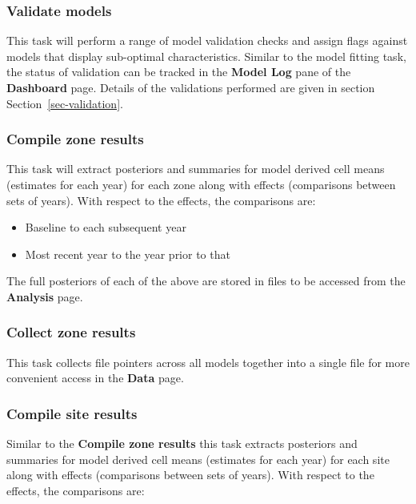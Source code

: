 \documentclass[
  8pt,
  a4paper]{article}
\providecommand{\tightlist}{%
  \setlength{\itemsep}{0pt}\setlength{\parskip}{0pt}}\usepackage{longtable,booktabs,array}
\begin{document}
\subsubsection{Validate models}\label{validate-models}

This task will perform a range of model validation checks and assign
flags against models that display sub-optimal characteristics. Similar
to the model fitting task, the status of validation can be tracked in
the \textbf{Model Log} pane of the \textbf{Dashboard} page. Details of
the validations performed are given in section
Section~\ref{sec-validation}.

\subsubsection{Compile zone results}\label{compile-zone-results}

This task will extract posteriors and summaries for model derived cell
means (estimates for each year) for each zone along with effects
(comparisons between sets of years). With respect to the effects, the
comparisons are:

\begin{itemize}
\tightlist
\item
  Baseline to each subsequent year
\item
  Most recent year to the year prior to that
\end{itemize}

The full posteriors of each of the above are stored in files to be
accessed from the \textbf{Analysis} page.

\subsubsection{Collect zone results}\label{collect-zone-results}

This task collects file pointers across all models together into a
single file for more convenient access in the \textbf{Data} page.

\subsubsection{Compile site results}\label{compile-site-results}

Similar to the \textbf{Compile zone results} this task extracts
posteriors and summaries for model derived cell means (estimates for
each year) for each site along with effects (comparisons between sets of
years). With respect to the effects, the comparisons are:
\end{document}
